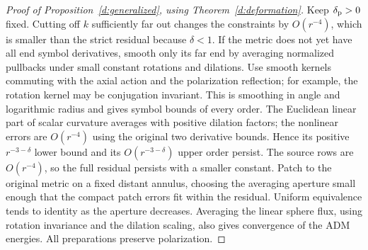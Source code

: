 \begin{proof}[Proof of Proposition~\ref{d:generalized}, using Theorem~\ref{d:deformation}]
Keep $\delta_{\rm p}>0$ fixed.  Cutting off $k$ sufficiently far out
changes the constraints by $O(r^{-4})$, which is smaller than the
strict residual because $\delta<1$.  If the metric does not yet have
all end symbol derivatives, smooth only its far end by averaging
normalized pullbacks under small constant rotations and dilations.
Use smooth kernels commuting with the axial action and the
polarization reflection; for example, the rotation kernel may be
conjugation invariant.  This is smoothing in angle and logarithmic
radius and gives symbol bounds of every order.  The Euclidean linear
part of scalar curvature averages with positive dilation factors;
the nonlinear errors are $O(r^{-4})$ using the original two derivative
bounds.  Hence its positive $r^{-3-\delta}$ lower bound and its
$O(r^{-3-\delta})$ upper order persist.  The source rows are
$O(r^{-4})$, so the full residual persists with a smaller constant.
Patch to the original metric on a fixed distant annulus, choosing
the averaging aperture small enough that the compact patch errors
fit within the residual.  Uniform equivalence tends to identity as
the aperture decreases.  Averaging the linear sphere flux, using
rotation invariance and the dilation scaling, also gives convergence
of the ADM energies.  All preparations preserve polarization.


\end{proof}
